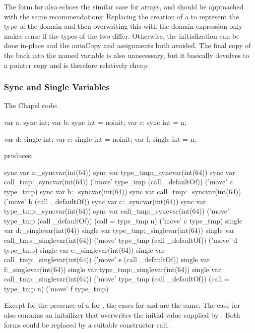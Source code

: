 The form for  also echoes the similar case for arrays, and should be approached
with the same recommendations: Replacing the creation of a  to represent
the type of the domain and then overwriting this with the domain expression only makes
sense if the types of the two differ.  Otherwise, the initialization can be done in-place
and the autoCopy and assignments both avoided.  The final copy of the  back
into the named variable is also unnecessary, but it basically devolves to a pointer copy
and is therefore relatively cheap.

\subsubsection{Sync and Single Variables}

The Chapel code:
\begin{chapel}
  var a: sync int;
  var b: sync int = noinit;
  var c: sync int = n;

  var d: single int;
  var e: single int = noinit;
  var f: single int = n;
\end{chapel}
produces:
\begin{numberedchapel}
    sync var a:_syncvar(int(64))
    {
      sync var type_tmp:_syncvar(int(64))
      sync var call_tmp:_syncvar(int(64))
      ('move' type_tmp (call _defaultOf))
      ('move' a type_tmp)
    }
    sync var b:_syncvar(int(64))
    sync var call_tmp:_syncvar(int(64))
    ('move' b (call _defaultOf))
    sync var c:_syncvar(int(64))
    {
      sync var type_tmp:_syncvar(int(64))
      sync var call_tmp:_syncvar(int(64))
      ('move' type_tmp (call _defaultOf))
      (call = type_tmp n)
      ('move' c type_tmp)
    }
    single var d:_singlevar(int(64))
    {
      single var type_tmp:_singlevar(int(64))
      single var call_tmp:_singlevar(int(64))
      ('move' type_tmp (call _defaultOf))
      ('move' d type_tmp)
    }
    single var e:_singlevar(int(64))
    single var call_tmp:_singlevar(int(64))
    ('move' e (call _defaultOf))
    single var f:_singlevar(int(64))
    {
      single var type_tmp:_singlevar(int(64))
      single var call_tmp:_singlevar(int(64))
      ('move' type_tmp (call _defaultOf))
      (call = type_tmp n)
      ('move' f type_tmp)
    }
\end{numberedchapel}

Except for the presence of a  for , the cases for  and
 are the same.  The case for  also contains an initailizer that
overwrites the initial value supplied by .  Both forms could be replaced
by a suitable constructor call.

